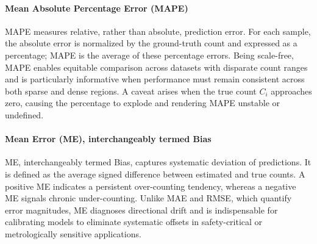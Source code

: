 \paragraph{Mean Absolute Percentage Error (MAPE)} MAPE measures relative, rather than absolute, prediction error. For each sample, the absolute error is normalized by the ground-truth count and expressed as a percentage; MAPE is the average of these percentage errors. Being scale-free, MAPE enables equitable comparison across datasets with disparate count ranges and is particularly informative when performance must remain consistent across both sparse and dense regions. A caveat arises when the true count $C_i$ approaches zero, causing the percentage to explode and rendering MAPE unstable or undefined.

\paragraph{Mean Error (ME), interchangeably termed Bias} ME, interchangeably termed Bias, captures systematic deviation of predictions. It is defined as the average signed difference between estimated and true counts. A positive ME indicates a persistent over-counting tendency, whereas a negative ME signals chronic under-counting. Unlike MAE and RMSE, which quantify error magnitudes, ME diagnoses directional drift and is indispensable for calibrating models to eliminate systematic offsets in safety-critical or metrologically sensitive applications.

